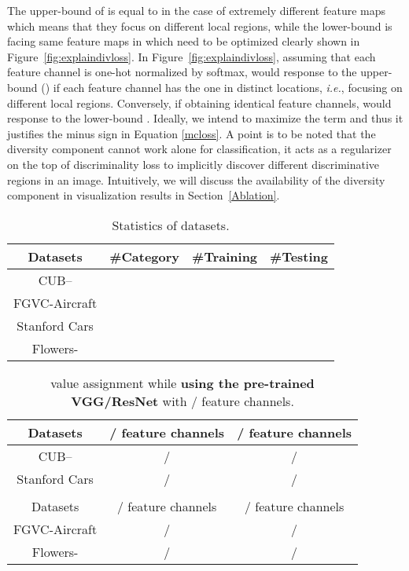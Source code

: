 \documentclass[journal]{IEEEtran}
\begin{document}
The upper-bound of  is equal to  in the case of  extremely different feature maps which means that they focus on different local regions, while the lower-bound is  facing  same feature maps in  which need to be optimized clearly shown in Figure~\ref{fig:explaindivloss}. In Figure~\ref{fig:explaindivloss}, assuming that each feature channel is one-hot normalized by softmax,   would response to the upper-bound  () if each feature channel has the one in distinct locations, \emph{i.e.},  focusing on different local regions. Conversely, if obtaining identical feature channels,  would response to the lower-bound . Ideally, we intend to maximize the  term and thus it justifies the minus sign in Equation \ref{mcloss}. A point is to be noted that the diversity component cannot work alone for classification, it acts as a regularizer on the top of discriminality loss to implicitly discover different discriminative regions in an image. Intuitively, we will discuss the availability of the diversity component in visualization results in Section~\ref{Ablation}. 








\begin{table}[!t]
  \centering
  \small
\caption{Statistics of datasets.}
    \begin{tabular}{|c|c|c|c|}
    \hline
    Datasets         & \#Category & \#Training & \#Testing \\
    \hline
    \hline
    CUB-- &       &      &\\
    FGVC-Aircraft    &       &      &\\
    Stanford Cars    &       &      &\\
    Flowers-    &       &      &\\
    \hline
    \end{tabular}\label{tab:datasets}\end{table}


\begin{table}[!t]
  \centering
  \small
\caption{ value assignment while \textbf{using the pre-trained VGG/ResNet} with / feature channels.}
    \begin{tabular}{|c|c|c|}
    \hline
    Datasets              &  / feature channels   &  / feature channels \\
    \hline
    \hline
    CUB--      &/                    &/ \\
    Stanford Cars         &/                    &/  \\
    \hline

    \multicolumn{1}{r}{}  & \multicolumn{1}{r}{}         & \multicolumn{1}{r}{} \\
    \hline 
    Datasets              &/  feature channels    & / feature channels \\
    \hline
    \hline
    FGVC-Aircraft         &/                     &/\\
    Flowers-         &/                    &/ \\
    \hline
    \end{tabular}\label{tab:featuremaps}\end{table}
\end{document}
